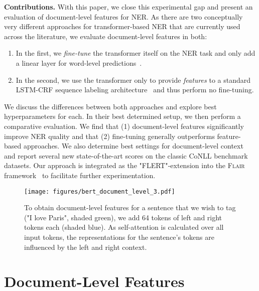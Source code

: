 \noindent
\textbf{Contributions.}
With this paper, we close this experimental gap and present an evaluation of document-level features for NER. As there are two conceptually very different approaches for transformer-based NER that are currently used across the literature, we evaluate document-level features in both: 

\begin{enumerate}
\vspace{-1mm}
    \item In the first, we \textit{fine-tune} the transformer itself on the NER task and only add a linear layer for word-level predictions~\cite{devlin-etal-2019-bert}.
\vspace{-1mm}
    \item In the second, we use the transformer only to provide \textit{features} to a standard LSTM-CRF sequence labeling architecture~\cite{2015arXiv150801991H} and thus perform no fine-tuning.
\end{enumerate}
\vspace{-1mm}
We discuss the differences between both approaches and explore best hyperparameters for each. In their best determined setup, we then perform a comparative evaluation.
We find that (1) document-level features significantly improve NER quality and that (2) fine-tuning generally outperforms feature-based approaches. We also determine best settings for document-level context and report several new state-of-the-art scores on the classic CoNLL benchmark datasets. Our approach is integrated as the "FLERT"-extension into the \textsc{Flair} framework~\cite{akbik-etal-2019-flair} to facilitate further experimentation.

\begin{figure*}
\vspace{-3mm}
 \centering
 \texttt{[image: figures/bert\_document\_level\_3.pdf]}
\vspace{-7mm}
 \caption{To obtain document-level features for a sentence that we wish to tag ("I love Paris", shaded green), we add 64 tokens of left and right tokens each (shaded blue). As self-attention is calculated over all input tokens, the representations for the sentence's tokens are influenced by the left and right context.}
\vspace{-3mm}
 \label{overview-bert-fine-tuning-document-level}
\end{figure*}

   

\section{Document-Level Features}
\vspace{-2mm}

